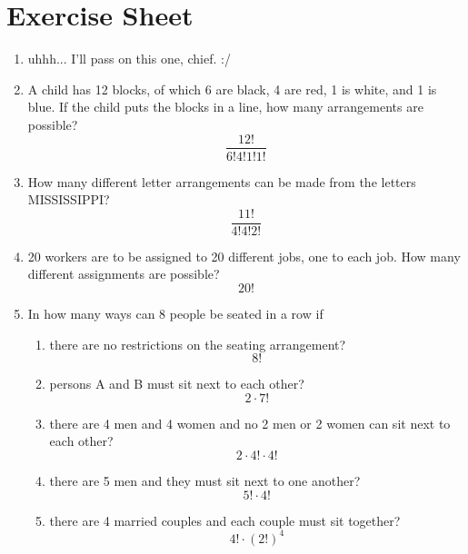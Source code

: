 \documentclass[11pt, a4paper]{article}
\begin{document}
\section{Exercise Sheet}
\begin{enumerate}
  \item uhhh... I'll pass on this one, chief. :/
  \item A child has 12 blocks, of which 6 are black, 4 are red, 1 is white, and 1 is blue. If the child
puts the blocks in a line, how many arrangements are possible?
 $$\boxed{\frac{12!}{6!4!1!1!}}$$ 
  \item How many different letter arrangements can be made from the letters MISSISSIPPI?
  $$\boxed{\frac{11!}{4!4!2!}}$$
  \item  20 workers are to be assigned to 20 different jobs, one to each job. How many different
assignments are possible?
$$\boxed{20!}$$
  \item In how many ways can 8 people be seated in a row if
  \begin{enumerate}
    \item  there are no restrictions on the seating arrangement?
    $$\boxed{8!}$$
    \item  persons A and B must sit next to each other?
    $$\boxed{2 \cdot 7!}$$
    \item  there are 4 men and 4 women and no 2 men or 2 women can sit next to each other?
    $$\boxed{2\cdot 4! \cdot 4!}$$
    \item  there are 5 men and they must sit next to one another?
    $$\boxed{5! \cdot 4!}$$
    \item  there are 4 married couples and each couple must sit together?
    $$\boxed{4! \cdot (2!)^4}$$
  \end{enumerate}


\end{enumerate}
\end{document}
